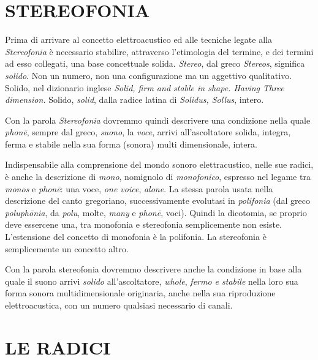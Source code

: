 \vfill\null

\section{STEREOFONIA}

Prima di arrivare al concetto elettroacustico ed alle tecniche legate alla
\emph{Stereofonia} è necessario stabilire, attraverso l'etimologia del termine,
e dei termini ad esso collegati, una base concettuale solida. \emph{Stereo},
dal greco \emph{Stereos}, significa \emph{solido}. Non un numero, non una
configurazione ma un aggettivo qualitativo. Solido, nel dizionario inglese
\emph{Solid, firm and stable in shape. Having Three dimension.} Solido,
\emph{solid}, dalla radice latina di \emph{Solidus, Sollus}, intero.

Con la parola \emph{Stereofonia} dovremmo quindi descrivere una condizione
nella quale \emph{phon\={e}}, sempre dal greco, \emph{suono}, la \emph{voce},
arrivi all'ascoltatore solida, integra, ferma e stabile nella sua forma (sonora)
multi dimensionale, intera.

Indispensabile alla comprensione del mondo sonoro elettracustico, nelle sue
radici, è anche la descrizione di \emph{mono}, nomignolo di \emph{monofonico},
espresso nel legame tra \emph{monos} e \emph{phon\={e}}: una voce,
\emph{one voice}, \emph{alone}. La stessa parola usata nella descrizione del
canto gregoriano, successivamente evolutasi in \emph{polifonia} (dal greco
\emph{poluph\={o}nia}, da \emph{polu}, molte, \emph{many} e \emph{phon\={e}},
voci). Quindi la dicotomia, se proprio deve essercene una, tra monofonia e
stereofonia semplicemente non esiste. L'estensione del concetto di monofonia è
la polifonia. La stereofonia è semplicemente un concetto altro.

Con la parola stereofonia dovremmo descrivere anche la condizione in base alla
quale il suono arrivi \emph{solido} all'ascoltatore, \emph{whole}, \emph{fermo e
stabile} nella loro sua forma sonora multidimensionale originaria, anche nella
sua riproduzione elettroacustica, con un numero qualsiasi necessario di canali.

\clearpage

\section{LE RADICI}

